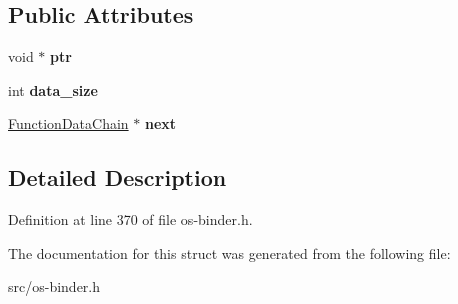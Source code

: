 \subsection*{Public Attributes}
\begin{DoxyCompactItemize}
\item 
void $\ast$ {\bfseries ptr}\hypertarget{struct_object_script_1_1_function_data_chain_a7677011f675f29688efaa11079ff5ef7}{}\label{struct_object_script_1_1_function_data_chain_a7677011f675f29688efaa11079ff5ef7}

\item 
int {\bfseries data\+\_\+size}\hypertarget{struct_object_script_1_1_function_data_chain_a874966e59fbd3d39158bb2845d086b11}{}\label{struct_object_script_1_1_function_data_chain_a874966e59fbd3d39158bb2845d086b11}

\item 
\hyperlink{struct_object_script_1_1_function_data_chain}{Function\+Data\+Chain} $\ast$ {\bfseries next}\hypertarget{struct_object_script_1_1_function_data_chain_a487c6740b93e0cb43db175f45d9dbec5}{}\label{struct_object_script_1_1_function_data_chain_a487c6740b93e0cb43db175f45d9dbec5}

\end{DoxyCompactItemize}


\subsection{Detailed Description}


Definition at line 370 of file os-\/binder.\+h.



The documentation for this struct was generated from the following file\+:\begin{DoxyCompactItemize}
\item 
src/os-\/binder.\+h\end{DoxyCompactItemize}
